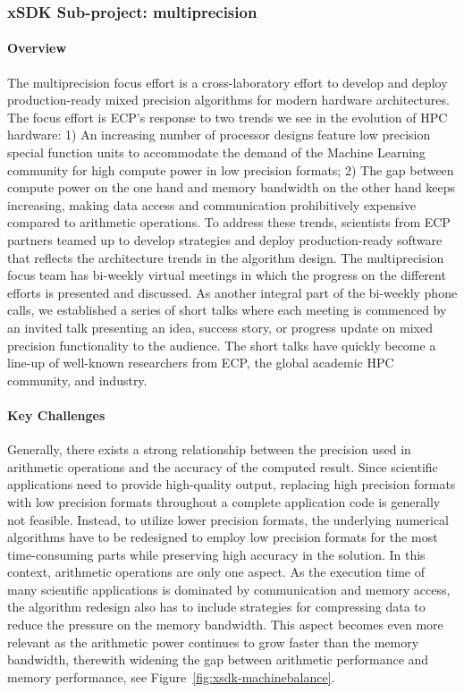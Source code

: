 \subsubsection{ xSDK Sub-project: multiprecision} 
\paragraph{Overview} 
The multiprecision focus effort is a cross-laboratory effort to develop and deploy production-ready 
mixed precision algorithms for modern hardware architectures. 
The focus effort is ECP's response to two trends we see in the evolution of HPC hardware:
1) An increasing number of processor designs feature low precision special function units 
to accommodate the demand of the Machine Learning community for high compute power
in low precision formats;
2) The gap between compute power on the one hand and memory bandwidth 
on the other hand keeps increasing, making data access and communication prohibitively 
expensive compared to arithmetic operations. 
To address these trends, scientists from ECP partners teamed up to develop strategies and deploy
production-ready software that reflects the architecture trends in the algorithm design. The multiprecision focus team has bi-weekly virtual meetings in which the progress on the different efforts is presented and discussed. As another integral part of the bi-weekly phone calls, we established a series of short talks where each meeting is commenced by an invited talk presenting an idea, success story, or progress update on mixed precision functionality to the audience. The short talks have quickly become a line-up of well-known researchers from ECP, the global academic HPC community, and industry.

\paragraph{Key Challenges}
Generally, there exists a strong relationship between the precision used in arithmetic operations and the accuracy of the computed result. Since scientific applications need to provide high-quality output, replacing high precision formats with low precision formats throughout a complete application code is generally not feasible. Instead, to utilize lower precision formats, the underlying numerical algorithms have to be redesigned to employ low precision formats for the most time-consuming parts while preserving high accuracy in the solution. In this context, arithmetic operations are only one aspect. As the execution time of many scientific applications is dominated by communication and memory access, the algorithm redesign also has to include strategies for compressing data to reduce the pressure on the memory bandwidth. This aspect becomes even more relevant as the arithmetic power continues to grow faster than the memory bandwidth, therewith widening the gap between arithmetic performance and memory performance, see Figure~\ref{fig:xsdk-machinebalance}.

